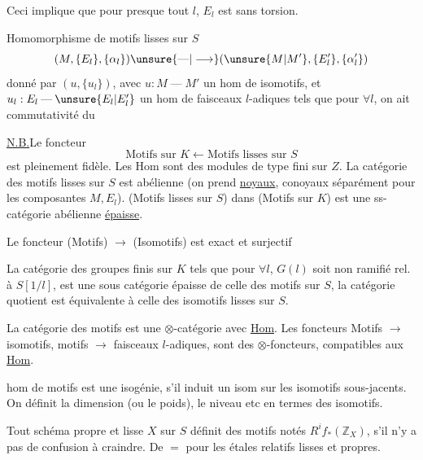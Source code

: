 Ceci implique que pour presque tout \(l\), \(E_l\) est sans torsion.

Homomorphisme de motifs lisses sur \(S\)
\[
(M,\{E_l\},\{\alpha_l\})\unsure{\mathbin{\text{---}}|\longrightarrow}(\unsure{M|M'},\{E'_l\},\{\alpha'_l\})
\]
donné par \((u,\{u_l\})\), avec \(u:M\mathbin{\text{---}}M'\) un hom de
isomotifs,  et \(u_l:E_l\mathbin{\text{---}}\unsure{E_l|E'_l}\) un hom de
faisceaux \(l\)-adiques tels que pour \(\forall l\), on ait commutativité du

\uline{N.B.}\quad Le foncteur 
\[
\text{Motifs sur }K\longleftarrow\text{Motifs lisses sur }S
\]
est pleinement fidèle. Les Hom sont des modules de type fini sur \(Z\).
La catégorie des motifs lisses sur \(S\) est abélienne
(on prend \uline{noyaux}, conoyaux séparément pour les composantes \(M,E_l\)).
 
(Motifs lisses sur \(S\)) dans (Motifs sur \(K\))
est une ss-catégorie abélienne \uline{épaisse}.

Le foncteur (Motifs)
\(\longrightarrow\) (Isomotifs) est exact et surjectif

La catégorie des groupes finis  sur \(K\) tels que pour
\(\forall l\), \(G(l)\) soit non ramifié rel. à \(S[1/l]\), est une sous
catégorie épaisse de celle des motifs sur \(S\), la catégorie
quotient est équivalente à celle des isomotifs lisses sur \(S\).

La catégorie des motifs est une \(\otimes\)-catégorie avec
\uline{Hom}. Les foncteurs Motifs \(\longrightarrow\) isomotifs, motifs \(\longrightarrow\)
faisceaux \(l\)-adiques, sont des \(\otimes\)-foncteurs, compatibles aux
\uline{Hom}.

  hom de motifs est une isogénie, s'il induit
un isom sur les isomotifs sous-jacents. On définit
la dimension (ou le poids), le niveau etc en termes
des isomotifs.

Tout schéma propre et lisse \(X\) sur \(S\) définit des
motifs  notés \(R^if_*(\mathbb Z_X)\), s'il n'y a pas de confusion à
craindre. De \(=\) pour les  étales relatifs lisses et propres.

